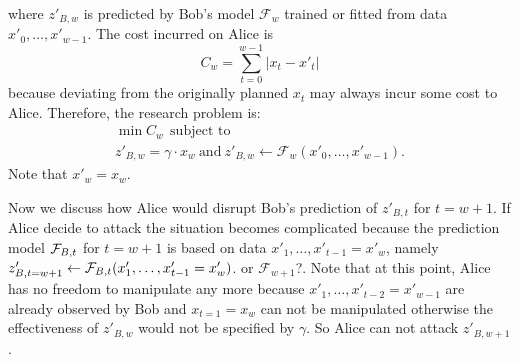 \documentclass[journal]{IEEEtran}
\begin{document}
where $z'_{B,w}$ is predicted by Bob's model $\mathcal{F}_{w}$ trained or fitted from data $x'_0,\ldots,x'_{w-1}$.
The cost incurred on Alice 
is 
$$
C_{w}=\sum_{t=0}^{w-1} \left|x_t -x'_t\right|
$$
because deviating from the originally planned $x_t$ may always incur some cost to Alice. 
Therefore, the research problem is:
\begin{eqnarray}
\label{eq:single-step-objective}
\min C_{w} ~~\text{subject to}~~ \\ 
z'_{B,w}=\gamma \cdot x_{w}~\text{and}~
z'_{B,w}\leftarrow\mathcal{F}_{w}(x'_0,\ldots,x'_{w-1}).
\end{eqnarray}
Note that $x'_{w}=x_{w}$.

Now we discuss how Alice would disrupt Bob's prediction of $z'_{B,t}$ for $t= w+1$. If Alice decide to attack  the situation becomes complicated because the prediction model ${\cal F}_{B,t}$ for $t= w+1$ is based on data $x'_1,\ldots,x'_{t-1}=x'_{w}$, namely $z'_{B,t=w+1}\leftarrow {\cal F}_{B,t}(x'_1,\ldots,x'_{t-1}=x'_{w})$. {\color{purple} or $\mathcal{F}_{w+1}$?}. Note that at this point, Alice has no freedom to manipulate any more because $x'_1,\ldots,x'_{t-2}=x'_{w-1}$ are already observed by Bob and $x_{t=1}=x_{w}$ can not be manipulated otherwise the effectiveness of $z'_{B,w}$ would not be specified by $\gamma$. So Alice can not attack $z'_{B,w+1}$. 
\end{document}
